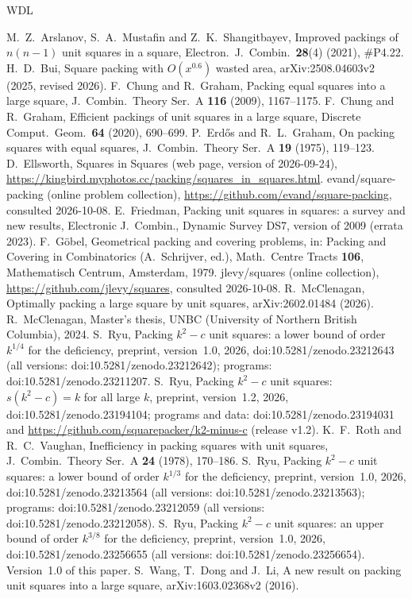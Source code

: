 \documentclass[11pt]{amsart}
\theoremstyle{definition}
\theoremstyle{remark}
\numberwithin{equation}{section}
\begin{document}
\begin{thebibliography}{WDL}
\raggedright
{} M.~Z.~Arslanov, S.~A.~Mustafin and Z.~K.~Shangitbayev, Improved packings of $n(n-1)$ unit squares in a
square, Electron.\ J.\ Combin.\ \textbf{28}(4) (2021), \#P4.22.
 H.~D.~Bui, Square packing with $O(x^{0.6})$ wasted area, arXiv:2508.04603v2 (2025, revised 2026).
 F.~Chung and R.~Graham, Packing equal squares into a large square, J.\ Combin.\ Theory Ser.~A
\textbf{116} (2009), 1167--1175.
 F.~Chung and R.~Graham, Efficient packings of unit squares in a large square, Discrete Comput.\ Geom.\
\textbf{64} (2020), 690--699.
 P.~Erd\H{o}s and R.~L.~Graham, On packing squares with equal squares, J.\ Combin.\ Theory Ser.~A
\textbf{19} (1975), 119--123.
 D.~Ellsworth, Squares in Squares (web page, version of 2026-09-24),
\url{https://kingbird.myphotos.cc/packing/squares_in_squares.html}.
\bibitem[Ev]{Ev} evand/square-packing (online problem collection), \url{https://github.com/evand/square-packing},
consulted 2026-10-08.
 E.~Friedman, Packing unit squares in squares: a survey and new results, Electronic J.\ Combin.,
Dynamic Survey DS7, version of 2009 (errata 2023).
 F.~G\"obel, Geometrical packing and covering problems, in: Packing and Covering in Combinatorics
(A.~Schrijver, ed.), Math.\ Centre Tracts \textbf{106}, Mathematisch Centrum, Amsterdam, 1979.
\bibitem[Le]{Le} jlevy/squares (online collection), \url{https://github.com/jlevy/squares}, consulted 2026-10-08.
\bibitem[McC]{McC} R.~McClenagan, Optimally packing a large square by unit squares, arXiv:2602.01484 (2026).
\bibitem[McC2]{McC2} R.~McClenagan, Master's thesis, UNBC (University of Northern British Columbia), 2024.
\bibitem[Q]{Q} S.~Ryu, Packing $k^2-c$ unit squares: a lower bound of order $k^{1/4}$ for the deficiency, preprint,
version~1.0, 2026, doi:10.5281/zenodo.23212643 (all versions: doi:10.5281/zenodo.23212642); programs:
doi:10.5281/zenodo.23211207.
 S.~Ryu, Packing $k^2-c$ unit squares: $s(k^2-c)=k$ for all large $k$, preprint, version~1.2, 2026,
doi:10.5281/zenodo.23194104; programs and data: doi:10.5281/zenodo.23194031 and
\url{https://github.com/squarepacker/k2-minus-c} (release v1.2).
\bibitem[RV]{RV} K.~F.~Roth and R.~C.~Vaughan, Inefficiency in packing squares with unit squares, J.\ Combin.\ Theory
Ser.~A \textbf{24} (1978), 170--186.
 S.~Ryu, Packing $k^2-c$ unit squares: a lower bound of order $k^{1/3}$ for the deficiency, preprint,
version~1.0, 2026, doi:10.5281/zenodo.23213564 (all versions: doi:10.5281/zenodo.23213563); programs:
doi:10.5281/zenodo.23212059 (all versions: doi:10.5281/zenodo.23212058).
\bibitem[U]{U} S.~Ryu, Packing $k^2-c$ unit squares: an upper bound of order $k^{3/8}$ for the deficiency, preprint,
version~1.0, 2026, doi:10.5281/zenodo.23256655 (all versions: doi:10.5281/zenodo.23256654). Version~1.0 of this paper.
\bibitem[WDL]{WDL} S.~Wang, T.~Dong and J.~Li, A new result on packing unit squares into a large square,
arXiv:1603.02368v2 (2016).
\end{thebibliography}
\end{document}
